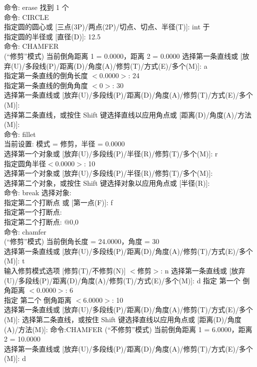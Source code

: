 命令: erase 找到 1 个\\
命令: CIRCLE\\
指定圆的圆心或 [三点(3P)/两点(2P)/切点、切点、半径(T)]: int 于\\
指定圆的半径或 [直径(D)]: 12.5\\
命令:  CHAMFER\\
(“修剪”模式) 当前倒角距离 1 = 0.0000，距离 2 = 0.0000
选择第一条直线或 [放弃(U)/多段线(P)/距离(D)/角度(A)/修剪(T)/方式(E)/多个(M)]:  a \\
指定第一条直线的倒角长度 $<$0.0000$>$: 24 \\
指定第一条直线的倒角角度 $<$0$>$: 30\\
选择第一条直线或 [放弃(U)/多段线(P)/距离(D)/角度(A)/修剪(T)/方式(E)/多个(M)]:\\
选择第二条直线，或按住 Shift 键选择直线以应用角点或 [距离(D)/角度(A)/方法(M)]:\\
命令: fillet\\
当前设置: 模式 = 修剪，半径 = 0.0000\\
选择第一个对象或 [放弃(U)/多段线(P)/半径(R)/修剪(T)/多个(M)]: r \\
指定圆角半径$<$0.0000$>$: 10\\
选择第一个对象或 [放弃(U)/多段线(P)/半径(R)/修剪(T)/多个(M)]:\\
选择第二个对象，或按住 Shift 键选择对象以应用角点或 [半径(R)]:\\
命令: break 选择对象:\\
指定第二个打断点 或 [第一点(F)]: f\\
指定第一个打断点:\\
指定第二个打断点: @0,0\\
命令: chamfer\\
(“修剪”模式) 当前倒角长度 = 24.0000，角度 = 30\\
选择第一条直线或 [放弃(U)/多段线(P)/距离(D)/角度(A)/修剪(T)/方式(E)/多个(M)]:  t\\
输入修剪模式选项 [修剪(T)/不修剪(N)] $<$修剪$>$: n
选择第一条直线或 [放弃(U)/多段线(P)/距离(D)/角度(A)/修剪(T)/方式(E)/多个(M)]:  d 指定 第一个 倒角距离 $<0.0000>$: 6\\
 指定 第二个 倒角距离 $<6.0000>$: 10\\
选择第一条直线或 [放弃(U)/多段线(P)/距离(D)/角度(A)/修剪(T)/方式(E)/多个(M)]:
选择第二条直线，或按住 Shift 键选择直线以应用角点或 [距离(D)/角度(A)/方法(M)]:
命令:CHAMFER
(“不修剪”模式) 当前倒角距离 1 = 6.0000，距离 2 = 10.0000\\
选择第一条直线或 [放弃(U)/多段线(P)/距离(D)/角度(A)/修剪(T)/方式(E)/多个(M)]:  d \\
